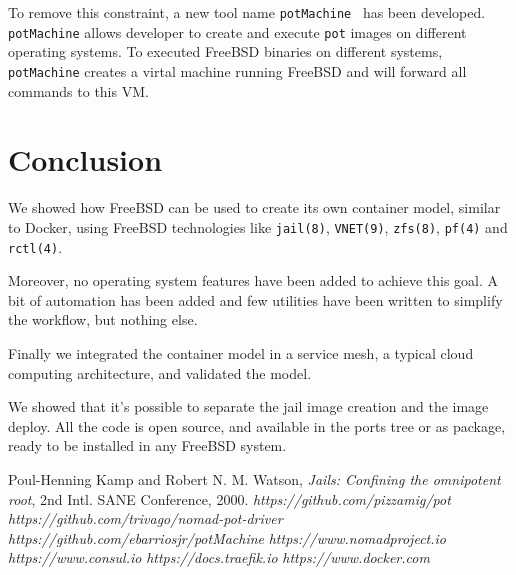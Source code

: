 \documentclass[conference,a4paper,11pt]{IEEEtran}
\begin{document}
To remove this constraint, a new tool name \texttt{potMachine}~\cite{potMachine} has been developed. \texttt{potMachine} allows developer to create and execute \texttt{pot} images on different operating systems. To executed FreeBSD binaries on different systems, \texttt{potMachine} creates a virtal machine running FreeBSD and will forward all commands to this VM.

\section{Conclusion}\label{sec:Conclusion}
We showed how FreeBSD can be used to create its own container model, similar to Docker, using FreeBSD technologies like \texttt{jail(8)}, \texttt{VNET(9)}, \texttt{zfs(8)}, \texttt{pf(4)} and \texttt{rctl(4)}.

Moreover, no operating system features have been added to achieve this goal. A bit of automation has been added and few utilities have been written to simplify the workflow, but nothing else.

Finally we integrated the container model in a service mesh, a typical cloud computing architecture, and validated the model.

We showed that it’s possible to separate the jail image creation and the image deploy.
All the code is open source, and available in the ports tree or as package, ready to be installed in any FreeBSD system.

\begin{thebibliography}{1}

	Poul-Henning Kamp and Robert N. M. Watson, \emph{ Jails: Confining the omnipotent root}, 2nd Intl. SANE Conference, 2000.
	\emph{https://github.com/pizzamig/pot}
	\emph{https://github.com/trivago/nomad-pot-driver}
	\emph{https://github.com/ebarriosjr/potMachine}
	\emph{https://www.nomadproject.io}
	\emph{https://www.consul.io}
	\emph{https://docs.traefik.io}
	\emph{https://www.docker.com}
\end{thebibliography}
\end{document}
